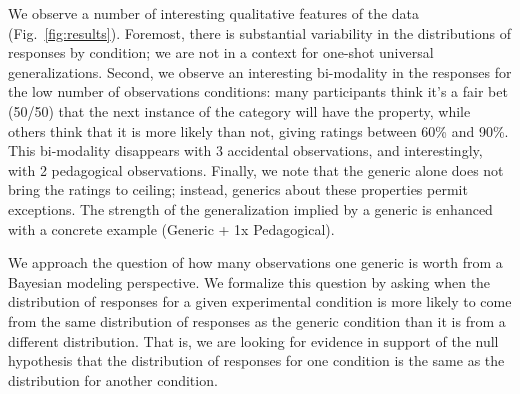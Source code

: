 \documentclass[10pt,letterpaper]{article}
\newcommand{\mht}[1]{\textcolor{Blue}{[mht: #1]}}
\begin{document}
We observe a number of interesting qualitative features of the data (Fig.~\ref{fig:results}). Foremost, there is substantial variability in the distributions of responses by condition; we are not in a context for one-shot universal generalizations. Second, we observe an interesting bi-modality in the responses for the low number of observations conditions: many participants think it's a fair bet (50/50) that the next instance of the category will have the property, while others think that it is more likely than not, giving ratings between 60\% and 90\%. This bi-modality disappears with 3 accidental observations, and interestingly, with 2 pedagogical observations. Finally, we note that the generic alone does not bring the ratings to ceiling; instead, generics about these properties permit exceptions. The strength of the generalization implied by a generic is enhanced with a concrete example (Generic + 1x Pedagogical). 






We approach the question of how many observations one generic is worth from a Bayesian modeling perspective. 
We formalize this question by asking when the distribution of responses for a given experimental condition is more likely to come from the same distribution of responses as the generic condition than it is from a different distribution. That is, we are looking for evidence in support of the null hypothesis that the distribution of responses for one condition is the same as the distribution for another condition. 
\end{document}
